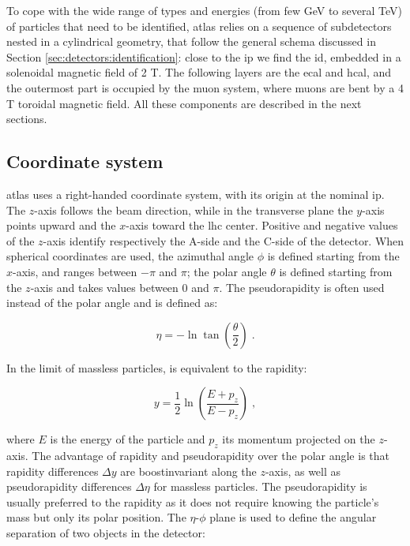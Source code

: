 To cope with the wide range of types and energies (from few GeV to several TeV) of particles that need to be identified, \gls{atlas} relies on a sequence of subdetectors nested in a cylindrical geometry, that follow the general schema discussed in Section \ref{sec:detectors:identification}: close to the \gls{ip} we find the \gls{id}, embedded in a solenoidal magnetic field of 2 T. The following layers are the \gls{ecal} and \gls{hcal}, and the outermost part is occupied by the muon system, where muons are bent by a 4 T toroidal magnetic field. All these components are described in the next sections.

\subsection{Coordinate system}

\gls{atlas} uses a right-handed coordinate system, with its origin at the nominal \gls{ip}. The $z$-axis follows the beam direction, 
while in the transverse plane the $y$-axis points upward and the $x$-axis toward the \gls{lhc} center. Positive and negative values of the $z$-axis identify respectively the A-side and the C-side of the detector. 
When spherical coordinates are used, the azimuthal angle $\phi$ is defined starting from the $x$-axis, 
and ranges between $-\pi$ and $\pi$; the polar angle $\theta$ is defined starting from the $z$-axis and takes values between $0$ and $\pi$. 
The pseudorapidity is often used instead of the polar angle and is defined as: 
 
\begin{equation}
\eta = - \ln\tan\left(\frac{\theta}{2}\right) \; . \nonumber
\label{eq:cern:eta}
\end{equation}

\noindent In the limit of massless particles, is equivalent to the rapidity:

\begin{equation}
y = \frac{1}{2} \ln\left(\frac{E + p_z}{E - p_z}\right) \; , \nonumber
\label{eq:cern:y}
\end{equation}

\noindent where $E$ is the energy of the particle and $p_z$ its momentum projected on the $z$-axis. 
The advantage of rapidity and pseudorapidity over the polar angle is that rapidity differences $\Delta y$ are boostinvariant
along the $z$-axis, as well as pseudorapidity differences $\Delta \eta$ for massless particles.
The pseudorapidity is usually preferred to the rapidity as it does not require
knowing the particle’s mass but only its polar position.
The $\eta$-$\phi$ plane is used to define the angular separation of two objects in the detector:

